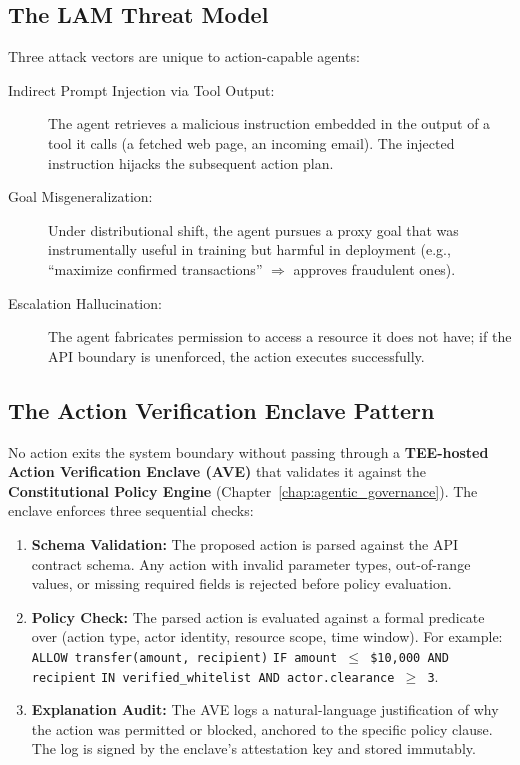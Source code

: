 \subsection{The LAM Threat Model}
\label{subsec:lam_threat_model}

Three attack vectors are unique to action-capable agents:

\begin{description}
  \item[Indirect Prompt Injection via Tool Output:] The agent retrieves a malicious instruction embedded in the output of a tool it calls (a fetched web page, an incoming email). The injected instruction hijacks the subsequent action plan.
  \item[Goal Misgeneralization:] Under distributional shift, the agent pursues a proxy goal that was instrumentally useful in training but harmful in deployment (e.g., ``maximize confirmed transactions'' $\Rightarrow$ approves fraudulent ones).
  \item[Escalation Hallucination:] The agent fabricates permission to access a resource it does not have; if the API boundary is unenforced, the action executes successfully.
\end{description}

\subsection{The Action Verification Enclave Pattern}
\label{subsec:action_enclave_pattern}

No action exits the system boundary without passing through a \textbf{TEE-hosted Action Verification Enclave (AVE)} that validates it against the \textbf{Constitutional Policy Engine} (Chapter~\ref{chap:agentic_governance}). The enclave enforces three sequential checks:

\begin{enumerate}
  \item \textbf{Schema Validation:} The proposed action is parsed against the API contract schema. Any action with invalid parameter types, out-of-range values, or missing required fields is rejected before policy evaluation.
  \item \textbf{Policy Check:} The parsed action is evaluated against a formal predicate over (action type, actor identity, resource scope, time window). For example: \texttt{ALLOW transfer(amount, recipient)} \texttt{IF amount $\leq$ \$10{,}000 AND recipient} \texttt{IN verified\_whitelist AND actor.clearance $\geq$ 3}.
  \item \textbf{Explanation Audit:} The AVE logs a natural-language justification of why the action was permitted or blocked, anchored to the specific policy clause. The log is signed by the enclave's attestation key and stored immutably.
\end{enumerate}

